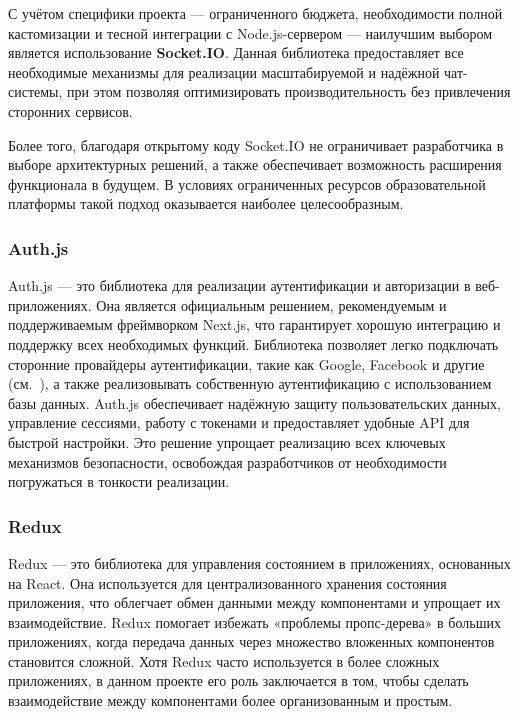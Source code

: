 С учётом специфики проекта — ограниченного бюджета, необходимости полной кастомизации и тесной интеграции с Node.js-сервером — наилучшим выбором является использование \textbf{Socket.IO}. Данная библиотека предоставляет все необходимые механизмы для реализации масштабируемой и надёжной чат-системы, при этом позволяя оптимизировать производительность без привлечения сторонних сервисов.

Более того, благодаря открытому коду Socket.IO не ограничивает разработчика в выборе архитектурных решений, а также обеспечивает возможность расширения функционала в будущем. В условиях ограниченных ресурсов образовательной платформы такой подход оказывается наиболее целесообразным.

\subsubsection*{Auth.js}

Auth.js — это библиотека для реализации аутентификации и авторизации в веб-приложениях. Она является официальным решением, рекомендуемым и поддерживаемым фреймворком Next.js, что гарантирует хорошую интеграцию и поддержку всех необходимых функций. Библиотека позволяет легко подключать сторонние провайдеры аутентификации, такие как Google, Facebook и другие (см.~\cite{nextauth_docs}), а также реализовывать собственную аутентификацию с использованием базы данных. Auth.js обеспечивает надёжную защиту пользовательских данных, управление сессиями, работу с токенами и предоставляет удобные API для быстрой настройки. Это решение упрощает реализацию всех ключевых механизмов безопасности, освобождая разработчиков от необходимости погружаться в тонкости реализации.  

\subsubsection*{Redux}

Redux — это библиотека для управления состоянием в приложениях, основанных на React\cite{redux_docs}. Она используется для централизованного хранения состояния приложения, что облегчает обмен данными между компонентами и упрощает их взаимодействие. Redux помогает избежать «проблемы пропс-дерева» в больших приложениях, когда передача данных через множество вложенных компонентов становится сложной. Хотя Redux часто используется в более сложных приложениях, в данном проекте его роль заключается в том, чтобы сделать взаимодействие между компонентами более организованным и простым.

